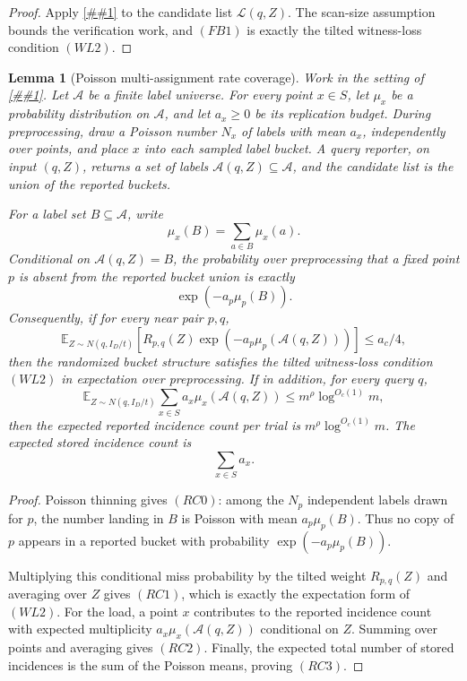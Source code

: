 \documentclass[10pt]{article}
\newcommand{\cref}[1]{\ref{##1}}
\newtheorem{lemma}[theorem]{Lemma}
\theoremstyle{definition}
\newcommand{\E}{\mathbb{E}}
\begin{document}
\begin{proof}
   Apply \cref{lem:smoothed-witness-list-compiler} to the candidate list
   \(\mathcal L(q,Z)\).  The scan-size assumption bounds the verification work,
   and \((FB1)\) is exactly the tilted witness-loss condition \((WL2)\).
\end{proof}

\begin{lemma}[Poisson multi-assignment rate coverage]
   \label{lem:poisson-rate-coverage}
   Work in the setting of \cref{lem:smoothed-witness-list-compiler}.  Let
   \(\mathcal A\) be a finite label universe.  For every point \(x\in S\), let
   \(\mu_x\) be a probability distribution on \(\mathcal A\), and let
   \(a_x\ge0\) be its replication budget.  During preprocessing, draw a
   Poisson number \(N_x\) of labels with mean \(a_x\), independently over
   points, and place \(x\) into each sampled label bucket.  A query reporter,
   on input \((q,Z)\), returns a set of labels
   \(\mathcal A(q,Z)\subseteq\mathcal A\), and the candidate list is the union
   of the reported buckets.

   For a label set \(B\subseteq\mathcal A\), write
   \[
      \mu_x(B)=\sum_{a\in B}\mu_x(a).
   \]
   Conditional on \(\mathcal A(q,Z)=B\), the probability over preprocessing
   that a fixed point \(p\) is absent from the reported bucket union is exactly
   \[
      \exp(-a_p\mu_p(B)).
      \tag{RC0}
   \]
   Consequently, if for every near pair \(p,q\),
   \[
      \E_{Z\sim N(q,I_D/t)}
      \left[
         R_{p,q}(Z)
         \exp(-a_p\mu_p(\mathcal A(q,Z)))
      \right]
      \le a_c/4 ,
      \tag{RC1}
   \]
   then the randomized bucket structure satisfies the tilted witness-loss
   condition \((WL2)\) in expectation over preprocessing.  If in addition, for
   every query \(q\),
   \[
      \E_{Z\sim N(q,I_D/t)}
      \sum_{x\in S}a_x\mu_x(\mathcal A(q,Z))
      \le
      m^\rho\log^{O_c(1)}m ,
      \tag{RC2}
   \]
   then the expected reported incidence count per trial is
   \(m^\rho\log^{O_c(1)}m\).  The expected stored incidence count is
   \[
      \sum_{x\in S}a_x .
      \tag{RC3}
   \]
\end{lemma}

\begin{proof}
   Poisson thinning gives \((RC0)\): among the \(N_p\) independent labels drawn
   for \(p\), the number landing in \(B\) is Poisson with mean
   \(a_p\mu_p(B)\).  Thus no copy of \(p\) appears in a reported bucket with
   probability \(\exp(-a_p\mu_p(B))\).

   Multiplying this conditional miss probability by the tilted weight
   \(R_{p,q}(Z)\) and averaging over \(Z\) gives \((RC1)\), which is exactly the
   expectation form of \((WL2)\).  For the load, a point \(x\) contributes to
   the reported incidence count with expected multiplicity
   \(a_x\mu_x(\mathcal A(q,Z))\) conditional on \(Z\).  Summing over points and
   averaging gives \((RC2)\).  Finally, the expected total number of stored
   incidences is the sum of the Poisson means, proving \((RC3)\).
\end{proof}
\end{document}
